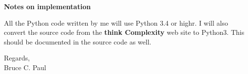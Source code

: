 \documentclass[12pt]{article}
\begin{document}
\begin{center}
{\bf Notes on implementation }
\end{center}

All the Python code written by me will use Python 3.4 or highr.  I will also
convert the source code from the {\bf think Complexity } web site to Python3.  This
should be documented in the source code as well.


\noindent Regards, \\
Bruce C. Paul
\end{document}
